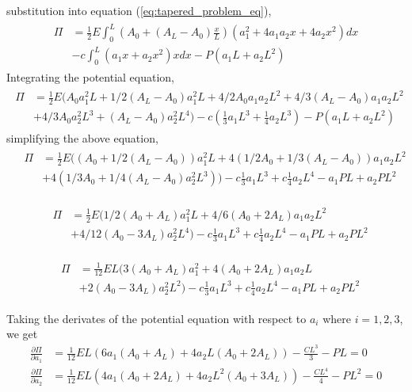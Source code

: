 \documentclass[a4paper]{memoir}
\begin{document}
substitution into equation (\ref{eq:tapered_problem_eq}),
\begin{align*}
	\begin{split}
	\Pi &= \frac{1}{2} E \int^L_0 (A_0+(A_L-A_0)\frac{x}{L})(a_1^2+4a_1a_2x+4a_2x^2) dx \\
			&- c\int^L_0 (a_1x+a_2x^2)xdx - P(a_1L+a_2L^2)	
	\end{split}
\end{align*}
Integrating the potential equation,
\begin{align*}
	\begin{split}
	\Pi &= \frac{1}{2}E( A_0a_1^2L + 1/2(A_L-A_0)a_1^2L + 4/2A_0a_1a_2L^2 + 4/3(A_L-A_0)a_1a_2L^2 \\
			&+ 4/3A_0a_2^2L^3 + (A_L-A_0)a_2^2L^4) - c(\frac{1}{3}a_1L^3+\frac{1}{4}a_2L^3) - P(a_1L+a_2L^2)
	\end{split}
\end{align*}
simplifying the above equation,
\begin{align*}
	&
	\begin{split}
	\Pi &= \frac{1}{2}E((A_0+1/2(A_L-A_0))a_1^2L + 4(1/2A_0+1/3(A_L-A_0))a_1a_2L^2 \\
			&+ 4(1/3A_0+1/4(A_L-A_0)a_2^2L^3)) - c\frac{1}{3}a_1L^3+c\frac{1}{4}a_2L^4 - a_1PL+a_2PL^2
	\end{split} 
\end{align*}

\begin{align*}
	&
	\begin{split}
	\Pi &= \frac{1}{2}E( 1/2(A_0+A_L)a_1^2L + 4/6(A_0+2A_L)a_1a_2L^2 \\
			&+ 4/12(A_0-3A_L)a_2^2L^4) - c\frac{1}{3}a_1L^3+c\frac{1}{4}a_2L^4 - a_1PL+a_2PL^2
	\end{split}
\end{align*}

\begin{align*}
	&
	\begin{split}
	\Pi &= \frac{1}{12}EL( 3(A_0+A_L)a_1^2 + 4(A_0+2A_L)a_1a_2L \\
			&+ 2(A_0-3A_L)a_2^2L^2) - c\frac{1}{3}a_1L^3+c\frac{1}{4}a_2L^4 - a_1PL+a_2PL^2
	\end{split}
\end{align*}

Taking the derivates of the potential equation with respect to $a_i$ where $i = 1,2,3$, we get
\begin{align*}
	\frac{\partial \Pi}{\partial a_1} &= \frac{1}{12} EL (6a_1(A_0+A_L)+4a_2L(A_0+2A_L)) - \frac{CL^3}{3} - PL = 0 \\
	\frac{\partial \Pi}{\partial a_2} &= \frac{1}{12} EL (4a_1(A_0+2A_L)+4a_2L^2(A_0+3A_L)) - \frac{CL^4}{4} - PL^2 = 0
\end{align*}
\end{document}
